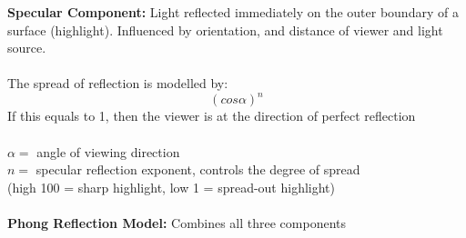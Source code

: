 \documentclass[a4paper,10pt]{article}
\begin{document}
\textcolor{Peach}{\textbf{Specular Component:}} Light reflected immediately on the outer boundary of a surface (highlight). Influenced by orientation, and distance of viewer and light source. \\\\
\indent The spread of reflection is modelled by: 
\begin{equation*}
(cos \alpha)^{n}
\end{equation*}
\indent If this equals to 1, then the viewer is at the direction of perfect reflection \\ \\
\indent $\alpha =$ angle of viewing direction \\
\indent $n =$ specular reflection exponent, controls the degree of spread \\
\indent (high 100 = sharp highlight, low 1 = spread-out highlight)\\ \\
\textcolor{Peach}{\textbf{Phong Reflection Model:}} Combines all three components \\\\
\end{document}
